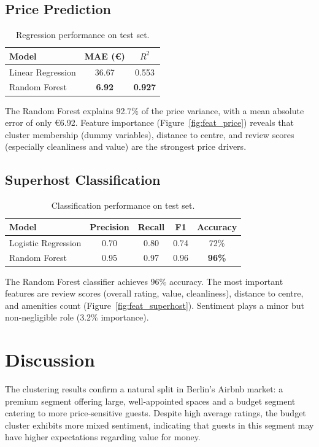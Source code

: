 \documentclass[11pt,a4paper]{article}
\begin{document}
\subsection{Price Prediction}
\begin{table}[H]
\centering
\caption{Regression performance on test set.}
\label{tab:price}
\begin{tabular}{lcc}
\toprule
\textbf{Model} & \textbf{MAE (€)} & \textbf{$R^2$} \\
\midrule
Linear Regression & 36.67 & 0.553 \\
Random Forest     & \textbf{6.92} & \textbf{0.927} \\
\bottomrule
\end{tabular}
\end{table}
The Random Forest explains 92.7\% of the price variance, with a mean absolute error of only €6.92. Feature importance (Figure~\ref{fig:feat_price}) reveals that cluster membership (dummy variables), distance to centre, and review scores (especially cleanliness and value) are the strongest price drivers.

\subsection{Superhost Classification}
\begin{table}[H]
\centering
\caption{Classification performance on test set.}
\label{tab:superhost}
\begin{tabular}{lcccc}
\toprule
\textbf{Model} & \textbf{Precision} & \textbf{Recall} & \textbf{F1} & \textbf{Accuracy} \\
\midrule
Logistic Regression & 0.70 & 0.80 & 0.74 & 72\% \\
Random Forest       & 0.95 & 0.97 & 0.96 & \textbf{96\%} \\
\bottomrule
\end{tabular}
\end{table}
The Random Forest classifier achieves 96\% accuracy. The most important features are review scores (overall rating, value, cleanliness), distance to centre, and amenities count (Figure~\ref{fig:feat_superhost}). Sentiment plays a minor but non‑negligible role (3.2\% importance).

\section{Discussion}
The clustering results confirm a natural split in Berlin’s Airbnb market: a premium segment offering large, well‑appointed spaces and a budget segment catering to more price‑sensitive guests. Despite high average ratings, the budget cluster exhibits more mixed sentiment, indicating that guests in this segment may have higher expectations regarding value for money.
\end{document}
